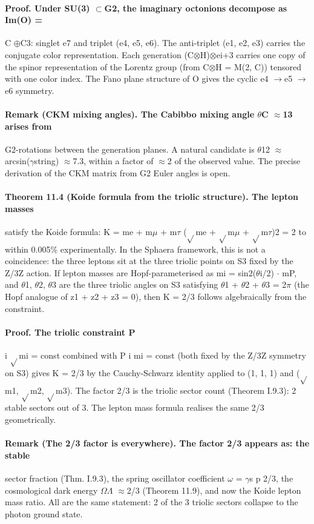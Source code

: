 \paragraph*{Proof. Under SU(3) $\subset$G2, the imaginary octonions decompose as Im(O) =}
C $\oplus$C3: singlet e7 and triplet (e4, e5, e6). The anti-triplet (e1, e2, e3) carries the conjugate color representation. Each generation (C$\otimes$H)$\otimes$ei+3 carries one copy of the spinor representation of the Lorentz group (from C$\otimes$H = M(2, C)) tensored with one color index. The Fano plane structure of O gives the cyclic e4 $\to$e5 $\to$e6 symmetry.
\paragraph*{Remark (CKM mixing angles). The Cabibbo mixing angle $\theta$C $\approx$13 arises from}
G2-rotations between the generation planes. A natural candidate is $\theta$12 $\approx$ arcsin($\gamma$string) $\approx$7.3, within a factor of $\approx$2 of the observed value. The precise derivation of the CKM matrix from G2 Euler angles is open.
\paragraph*{Theorem 11.4 (Koide formula from the triolic structure). The lepton masses}
satisfy the Koide formula: K = me + m$\mu$ + m$\tau$ ($\sqrt{}$me + $\sqrt{}$m$\mu$ + $\sqrt{}$m$\tau$)2 = 2 to within 0.005\% experimentally. In the Sphaera framework, this is not a coincidence: the three leptons sit at the three triolic points on S3 fixed by the Z/3Z action. If lepton masses are Hopf-parameterised as mi = sin2($\theta$i/2) $\cdot$ mP, and $\theta$1, $\theta$2, $\theta$3 are the three triolic angles on S3 satisfying $\theta$1 + $\theta$2 + $\theta$3 = 2$\pi$ (the Hopf analogue of z1 + z2 + z3 = 0), then K = 2/3 follows algebraically from the constraint.
\paragraph*{Proof. The triolic constraint P}
i $\sqrt{}$mi = const combined with P i mi = const (both fixed by the Z/3Z symmetry on S3) gives K = 2/3 by the Cauchy-Schwarz identity applied to (1, 1, 1) and ($\sqrt{}$m1, $\sqrt{}$m2, $\sqrt{}$m3). The factor 2/3 is the triolic sector count (Theorem I.9.3): 2 stable sectors out of 3. The lepton mass formula realises the same 2/3 geometrically.
\paragraph*{Remark (The 2/3 factor is everywhere). The factor 2/3 appears as: the stable}
sector fraction (Thm. I.9.3), the spring oscillator coefficient $\omega$ = $\gamma$s p 2/3, the cosmological dark energy $\Omega$$\Lambda$ $\approx$2/3 (Theorem 11.9), and now the Koide lepton mass ratio. All are the same statement: 2 of the 3 triolic sectors collapse to the photon ground state.
